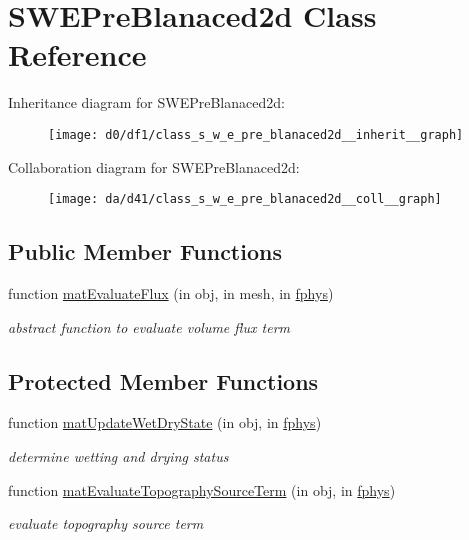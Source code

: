 \hypertarget{class_s_w_e_pre_blanaced2d}{}\section{S\+W\+E\+Pre\+Blanaced2d Class Reference}
\label{class_s_w_e_pre_blanaced2d}


Inheritance diagram for S\+W\+E\+Pre\+Blanaced2d\+:
\nopagebreak
\begin{figure}[H]
\begin{center}
\leavevmode
\texttt{[image: d0/df1/class\_s\_w\_e\_pre\_blanaced2d\_\_inherit\_\_graph]}
\end{center}
\end{figure}


Collaboration diagram for S\+W\+E\+Pre\+Blanaced2d\+:
\nopagebreak
\begin{figure}[H]
\begin{center}
\leavevmode
\texttt{[image: da/d41/class\_s\_w\_e\_pre\_blanaced2d\_\_coll\_\_graph]}
\end{center}
\end{figure}
\subsection*{Public Member Functions}
\begin{DoxyCompactItemize}
\item 
function \hyperlink{class_s_w_e_pre_blanaced2d_a59b0ef470db28d009b0c8aa863f29f8f}{mat\+Evaluate\+Flux} (in obj, in mesh, in \hyperlink{class_ndg_phys_a6b25724fc9474d32018439009072f0a9}{fphys})
\begin{DoxyCompactList}\small\item\em abstract function to evaluate volume flux term \end{DoxyCompactList}\end{DoxyCompactItemize}
\subsection*{Protected Member Functions}
\begin{DoxyCompactItemize}
\item 
function \hyperlink{class_s_w_e_pre_blanaced2d_a77864de8837b7a3f0b3c9ef6a7d8371d}{mat\+Update\+Wet\+Dry\+State} (in obj, in \hyperlink{class_ndg_phys_a6b25724fc9474d32018439009072f0a9}{fphys})
\begin{DoxyCompactList}\small\item\em determine wetting and drying status \end{DoxyCompactList}\item 
function \hyperlink{class_s_w_e_pre_blanaced2d_af89d6da5053d87a1f587d4d5f958ec1b}{mat\+Evaluate\+Topography\+Source\+Term} (in obj, in \hyperlink{class_ndg_phys_a6b25724fc9474d32018439009072f0a9}{fphys})
\begin{DoxyCompactList}\small\item\em evaluate topography source term \end{DoxyCompactList}\end{DoxyCompactItemize}
